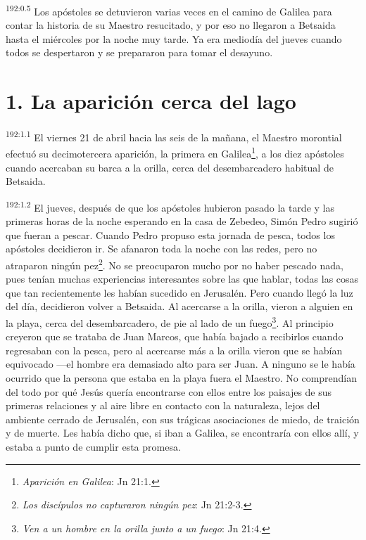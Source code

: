 \par 
\textsuperscript{192:0.5} Los apóstoles se detuvieron varias veces en el camino de Galilea para contar la historia de su Maestro resucitado, y por eso no llegaron a Betsaida hasta el miércoles por la noche muy tarde. Ya era mediodía del jueves cuando todos se despertaron y se prepararon para tomar el desayuno.

\section*{1. La aparición cerca del lago}
\par 
\textsuperscript{192:1.1} El viernes 21 de abril hacia las seis de la mañana, el Maestro morontial efectuó su decimotercera aparición, la primera en Galilea\footnote{\textit{Aparición en Galilea}: Jn 21:1.}, a los diez apóstoles cuando acercaban su barca a la orilla, cerca del desembarcadero habitual de Betsaida.

\par 
\textsuperscript{192:1.2} El jueves, después de que los apóstoles hubieron pasado la tarde y las primeras horas de la noche esperando en la casa de Zebedeo, Simón Pedro sugirió que fueran a pescar. Cuando Pedro propuso esta jornada de pesca, todos los apóstoles decidieron ir. Se afanaron toda la noche con las redes, pero no atraparon ningún pez\footnote{\textit{Los discípulos no capturaron ningún pez}: Jn 21:2-3.}. No se preocuparon mucho por no haber pescado nada, pues tenían muchas experiencias interesantes sobre las que hablar, todas las cosas que tan recientemente les habían sucedido en Jerusalén. Pero cuando llegó la luz del día, decidieron volver a Betsaida. Al acercarse a la orilla, vieron a alguien en la playa, cerca del desembarcadero, de pie al lado de un fuego\footnote{\textit{Ven a un hombre en la orilla junto a un fuego}: Jn 21:4.}. Al principio creyeron que se trataba de Juan Marcos, que había bajado a recibirlos cuando regresaban con la pesca, pero al acercarse más a la orilla vieron que se habían equivocado ---el hombre era demasiado alto para ser Juan. A ninguno se le había ocurrido que la persona que estaba en la playa fuera el Maestro. No comprendían del todo por qué Jesús quería encontrarse con ellos entre los paisajes de sus primeras relaciones y al aire libre en contacto con la naturaleza, lejos del ambiente cerrado de Jerusalén, con sus trágicas asociaciones de miedo, de traición y de muerte. Les había dicho que, si iban a Galilea, se encontraría con ellos allí, y estaba a punto de cumplir esta promesa.

